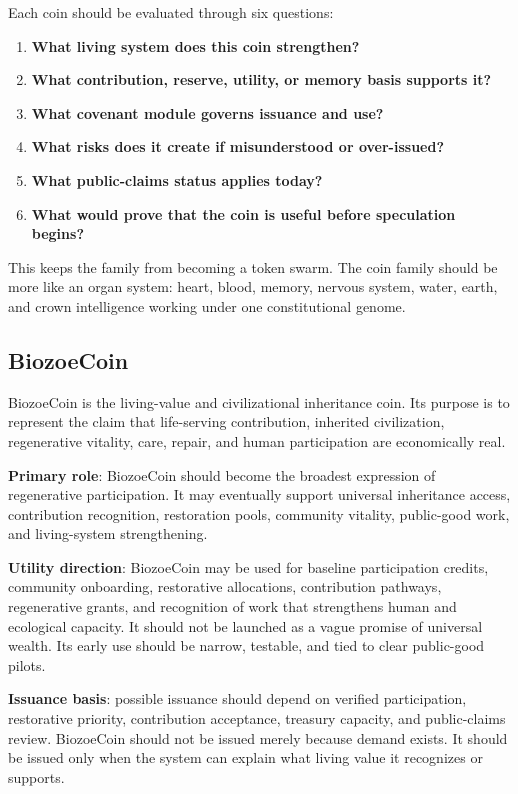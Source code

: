 \documentclass[12pt]{article}
\begin{document}
Each coin should be evaluated through six questions:

\begin{enumerate}
  \item \textbf{What living system does this coin strengthen?}
  \item \textbf{What contribution, reserve, utility, or memory basis supports it?}
  \item \textbf{What covenant module governs issuance and use?}
  \item \textbf{What risks does it create if misunderstood or over-issued?}
  \item \textbf{What public-claims status applies today?}
  \item \textbf{What would prove that the coin is useful before speculation begins?}
\end{enumerate}

This keeps the family from becoming a token swarm. The coin family should be more like an organ system: heart, blood, memory, nervous system, water, earth, and crown intelligence working under one constitutional genome.

\subsection{BiozoeCoin}

BiozoeCoin is the living-value and civilizational inheritance coin. Its purpose is to represent the claim that life-serving contribution, inherited civilization, regenerative vitality, care, repair, and human participation are economically real.

\textbf{Primary role}: BiozoeCoin should become the broadest expression of regenerative participation. It may eventually support universal inheritance access, contribution recognition, restoration pools, community vitality, public-good work, and living-system strengthening.

\textbf{Utility direction}: BiozoeCoin may be used for baseline participation credits, community onboarding, restorative allocations, contribution pathways, regenerative grants, and recognition of work that strengthens human and ecological capacity. It should not be launched as a vague promise of universal wealth. Its early use should be narrow, testable, and tied to clear public-good pilots.

\textbf{Issuance basis}: possible issuance should depend on verified participation, restorative priority, contribution acceptance, treasury capacity, and public-claims review. BiozoeCoin should not be issued merely because demand exists. It should be issued only when the system can explain what living value it recognizes or supports.
\end{document}
